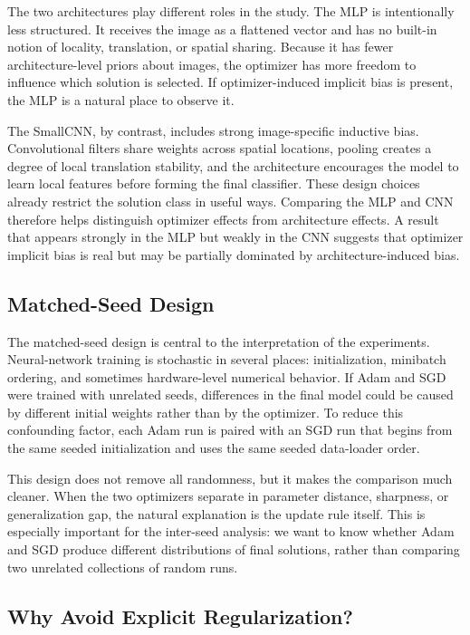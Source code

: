 \documentclass[11pt]{article}
\begin{document}
The two architectures play different roles in the study. The MLP is intentionally less structured. It receives the image as a flattened vector and has no built-in notion of locality, translation, or spatial sharing. Because it has fewer architecture-level priors about images, the optimizer has more freedom to influence which solution is selected. If optimizer-induced implicit bias is present, the MLP is a natural place to observe it.

The SmallCNN, by contrast, includes strong image-specific inductive bias. Convolutional filters share weights across spatial locations, pooling creates a degree of local translation stability, and the architecture encourages the model to learn local features before forming the final classifier. These design choices already restrict the solution class in useful ways. Comparing the MLP and CNN therefore helps distinguish optimizer effects from architecture effects. A result that appears strongly in the MLP but weakly in the CNN suggests that optimizer implicit bias is real but may be partially dominated by architecture-induced bias.

\subsection{Matched-Seed Design}

The matched-seed design is central to the interpretation of the experiments. Neural-network training is stochastic in several places: initialization, minibatch ordering, and sometimes hardware-level numerical behavior. If Adam and SGD were trained with unrelated seeds, differences in the final model could be caused by different initial weights rather than by the optimizer. To reduce this confounding factor, each Adam run is paired with an SGD run that begins from the same seeded initialization and uses the same seeded data-loader order.

This design does not remove all randomness, but it makes the comparison much cleaner. When the two optimizers separate in parameter distance, sharpness, or generalization gap, the natural explanation is the update rule itself. This is especially important for the inter-seed analysis: we want to know whether Adam and SGD produce different distributions of final solutions, rather than comparing two unrelated collections of random runs.

\subsection{Why Avoid Explicit Regularization?}
\end{document}
